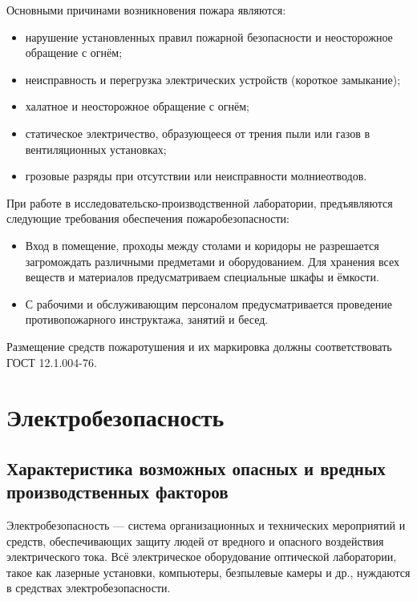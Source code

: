 Основными причинами возникновения пожара являются:
\begin{itemize}
	\item нарушение установленных правил пожарной безопасности и неосторожное обращение с огнём;
	\item неисправность и перегрузка электрических устройств (короткое замыкание);
	\item халатное и неосторожное обращение с огнём;
	\item статическое электричество, образующееся от трения пыли или газов в вентиляционных установках;
	\item грозовые разряды при отсутствии или неисправности молниеотводов.
\end{itemize}
При работе в исследовательско-производственной  лаборатории, предъявляются следующие требования обеспечения пожаробезопасности:
\begin{itemize}
	\item Вход в помещение, проходы между столами и коридоры не разрешается загромождать различными предметами и оборудованием. Для хранения всех веществ и материалов предусматриваем специальные шкафы и ёмкости.
	\item С рабочими и обслуживающим персоналом предусматривается проведение противопожарного инструктажа, занятий и бесед.
\end{itemize}
Размещение средств пожаротушения и их маркировка должны соответствовать ГОСТ 12.1.004-76.

\section{Электробезопасность}
\subsection{Характеристика возможных опасных и вредных производственных факторов}

Электробезопасность — система организационных и технических мероприятий и средств, обеспечивающих защиту людей от вредного и опасного воздействия электрического тока. Всё электрическое оборудование оптической лаборатории, такое как лазерные установки, компьютеры, безпылевые камеры и др., нуждаются в средствах электробезопасности.

